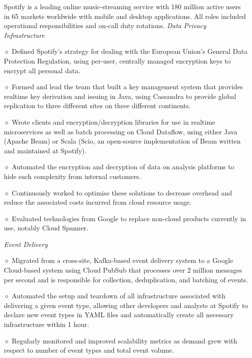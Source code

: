 \bigskip

\smallskip
Spotify is a leading online music-streaming service with 180 million active users in 65 markets 
worldwide with mobile and desktop applications. All roles included operational responsibilities and on-call duty rotations.
\smallskip
{\it Data Privacy Infrastructure}
\parindent=20pt
\item{$\diamond$} Defined Spotify's strategy for dealing with the European Union's General Data Protection Regulation, using per-user, centrally managed encryption keys to encrypt all personal data.
\item{$\diamond$} Formed and lead the team that built a key management system that provides realtime key derivation and issuing in Java, using Cassandra to provide global replication to three different sites on three different continents.
\item{$\diamond$} Wrote clients and encryption/decryption libraries for use in realtime microservices as well as batch processing on Cloud Dataflow, using either Java (Apache Beam) or Scala (Scio, an open-source implementation of Beam written and maintained at Spotify).
\item{$\diamond$} Automated the encryption and decryption of data on analysis platforms to hide such complexity from internal customers.
\item{$\diamond$} Continuously worked to optimise these solutions to decrease overhead and reduce the associated costs incurred from cloud resource usage.
\item{$\diamond$} Evaluated technologies from Google to replace non-cloud products currently in use, notably Cloud Spanner.
\parindent=0pt

{\it Event Delivery}
\parindent=20pt
\item{$\diamond$} Migrated from a cross-site, Kafka-based event delivery system to a Google Cloud-based system using Cloud PubSub that processes over 2 million messages per second and is responsible for collection, deduplication, and batching of events.
\item{$\diamond$} Automated the setup and teardown of all infrastructure associated with delivering a given event type, allowing other developers and analysts at Spotify to declare new event types in YAML files and automatically create all necessary infrastructure within 1 hour. 
\item{$\diamond$} Regularly monitored and improved scalability metrics as demand grew with respect to number of event types and total event volume.
\parindent=0pt

